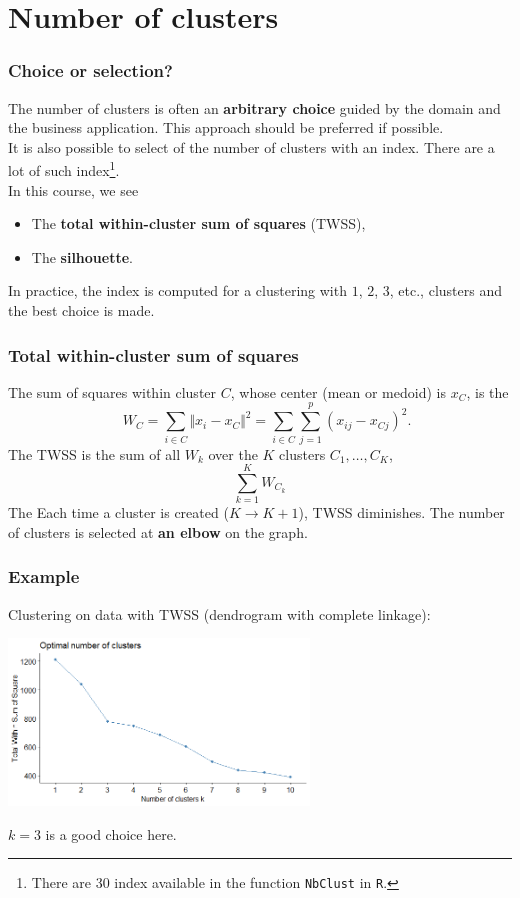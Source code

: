 \section{Number of clusters}
\begin{frame}
\frametitle{Choice or selection?}
The number of clusters is often an {\bf arbitrary choice} guided by the domain and the business application. This approach should be preferred if possible.\\
\vspace{0.3cm}
It is also possible to select of the number of clusters with an index. There are a lot of such index\footnote{There are 30 index available in the function {\tt NbClust} in {\tt R}.}.\\
\vspace{0.3cm}
In this course, we see
\begin{itemize}
\item The {\bf total within-cluster sum of squares} (TWSS),
\item The {\bf silhouette}.
\end{itemize}
In practice, the index is computed for a clustering with $1$, $2$, $3$, etc., clusters and the best choice is made.
\end{frame}
\begin{frame}
\frametitle{Total within-cluster sum of squares}
The sum of squares within cluster $C$, whose center (mean or medoid) is $x_C$, is the  
$$
\quad W_C=\sum_{i \in C} \Vert x_i - x_C\Vert^2 = \sum_{i \in C}\sum_{j=1}^p (x_{ij} - x_{Cj})^2.
$$
The TWSS is the sum of all $W_k$ over the $K$ clusters $C_1,\ldots,C_K$,
$$
\sum_{k=1}^K W_{C_k}
$$
The Each time a cluster is created ($K \rightarrow K+1$), TWSS diminishes. The number of clusters is selected at {\bf an elbow} on the graph.
\end{frame}
\begin{frame}
\frametitle{Example}
Clustering on data with TWSS (dendrogram with complete linkage):
\begin{center}
\includegraphics[width=8cm]{../../Graphs/Nb_agnes_hc_wss.png}
\end{center}
$k=3$ is a good choice here.
\end{frame}
